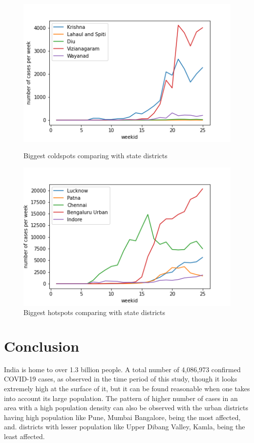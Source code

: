 \documentclass[a4paper,11pt]{article}
\begin{document}
\begin{figure}[!tbp]
  \centering
  \begin{minipage}[b]{0.45\textwidth}
    \includegraphics[width=\textwidth]{state-coldspot.png}
    \caption{Biggest coldspots comparing with state districts}
  \end{minipage}
  \hfill
  \begin{minipage}[b]{0.45\textwidth}
    \includegraphics[width=\textwidth]{state-hotspot.png}
    \caption{Biggest hotspots comparing with state districts}
  \end{minipage}
\end{figure}


\section{Conclusion}
India is home to over 1.3 billion people. A total number of 4,086,973 confirmed COVID-19 cases, as observed in the time period of this study, though it looks extremely high at the surface of it, but it can be found reasonable when one takes into account its large population. The pattern of higher number of cases in an area with a high population  density can also be observed with the urban districts having high population like Pune, Mumbai Bangalore, being the most affected, and. districts with lesser population like Upper Dibang Valley, Kamla, being the least affected.
\end{document}
